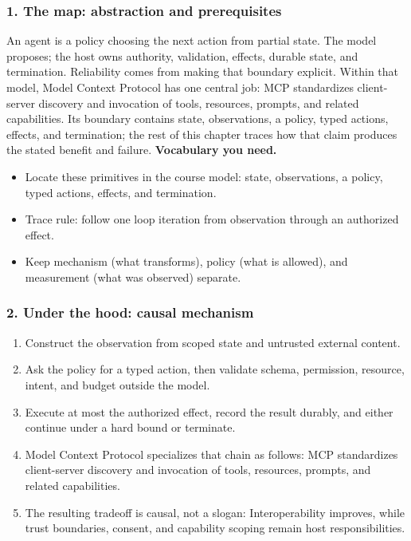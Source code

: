 \subsubsection*{1. The map: abstraction and prerequisites}
An agent is a policy choosing the next action from partial state. The model proposes; the host owns authority, validation, effects, durable state, and termination. Reliability comes from making that boundary explicit.
Within that model, Model Context Protocol has one central job: MCP standardizes client-server discovery and invocation of tools, resources, prompts, and related capabilities. Its boundary contains state, observations, a policy, typed actions, effects, and termination; the rest of this chapter traces how that claim produces the stated benefit and failure.
\textbf{Vocabulary you need.}\begin{itemize}
\item Locate these primitives in the course model: state, observations, a policy, typed actions, effects, and termination.
\item Trace rule: follow one loop iteration from observation through an authorized effect.
\item Keep mechanism (what transforms), policy (what is allowed), and measurement (what was observed) separate.
\end{itemize}
\subsubsection*{2. Under the hood: causal mechanism}\begin{enumerate}
\item Construct the observation from scoped state and untrusted external content.
\item Ask the policy for a typed action, then validate schema, permission, resource, intent, and budget outside the model.
\item Execute at most the authorized effect, record the result durably, and either continue under a hard bound or terminate.
\item Model Context Protocol specializes that chain as follows: MCP standardizes client-server discovery and invocation of tools, resources, prompts, and related capabilities.
\item The resulting tradeoff is causal, not a slogan: Interoperability improves, while trust boundaries, consent, and capability scoping remain host responsibilities.
\end{enumerate}
